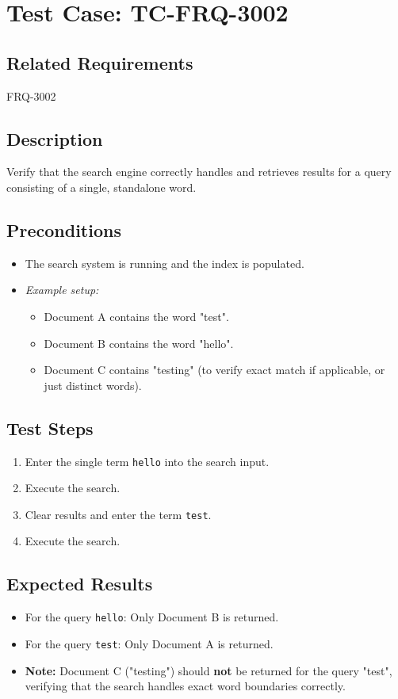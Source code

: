 \documentclass{article}
\begin{document}
\section{Test Case: TC-FRQ-3002}

\subsection*{Related Requirements}
FRQ-3002

\subsection*{Description}
Verify that the search engine correctly handles and retrieves results for a query consisting of a single, standalone word.

\subsection*{Preconditions}
\begin{itemize}
  \item The search system is running and the index is populated.
  \item[] \textit{Example setup:}
  \begin{itemize}
      \item Document A contains the word "test".
      \item Document B contains the word "hello".
      \item Document C contains "testing" (to verify exact match if applicable, or just distinct words).
  \end{itemize}
\end{itemize}

\subsection*{Test Steps}
\begin{enumerate}
        \item Enter the single term \texttt{hello} into the search input.
        \item Execute the search.
        \item Clear results and enter the term \texttt{test}.
        \item Execute the search.
    \end{enumerate}


\subsection*{Expected Results}
\begin{itemize}
        \item For the query \texttt{hello}: Only Document B is returned.
        \item For the query \texttt{test}: Only Document A is returned.
       \item \textbf{Note:} Document C ("testing") should \textbf{not} be returned for the query "test", verifying that the search handles exact word boundaries correctly.
    \end{itemize}
\end{document}
